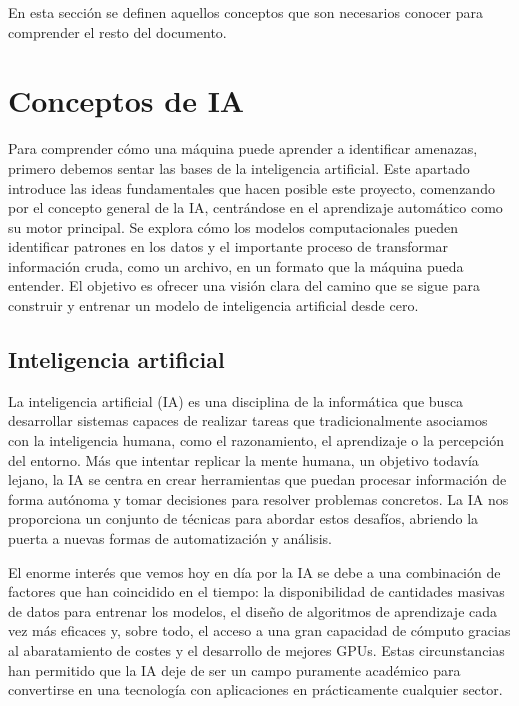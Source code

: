 
En esta sección se definen aquellos conceptos que son necesarios conocer para comprender el resto del documento.


\section{Conceptos de IA}

Para comprender cómo una máquina puede aprender a identificar amenazas, primero debemos sentar las bases de la inteligencia artificial. Este apartado introduce las ideas fundamentales que hacen posible este proyecto, comenzando por el concepto general de la IA, centrándose en el aprendizaje automático como su motor principal. Se explora cómo los modelos computacionales pueden identificar patrones en los datos y el importante proceso de transformar información cruda, como un archivo, en un formato que la máquina pueda entender. El objetivo es ofrecer una visión clara del camino que se sigue para construir y entrenar un modelo de inteligencia artificial desde cero.

\subsection{Inteligencia artificial}

La inteligencia artificial (IA) es una disciplina de la informática que busca desarrollar sistemas capaces de realizar tareas que tradicionalmente asociamos con la inteligencia humana, como el razonamiento, el aprendizaje o la percepción del entorno. Más que intentar replicar la mente humana, un objetivo todavía lejano, la IA se centra en crear herramientas que puedan procesar información de forma autónoma y tomar decisiones para resolver problemas concretos. La IA nos proporciona un conjunto de técnicas para abordar estos desafíos, abriendo la puerta a nuevas formas de automatización y análisis.

El enorme interés que vemos hoy en día por la IA se debe a una combinación de factores que han coincidido en el tiempo: la disponibilidad de cantidades masivas de datos para entrenar los modelos, el diseño de algoritmos de aprendizaje cada vez más eficaces y, sobre todo, el acceso a una gran capacidad de cómputo gracias al abaratamiento de costes y el desarrollo de mejores GPUs. Estas circunstancias han permitido que la IA deje de ser un campo puramente académico para convertirse en una tecnología con aplicaciones en prácticamente cualquier sector.

